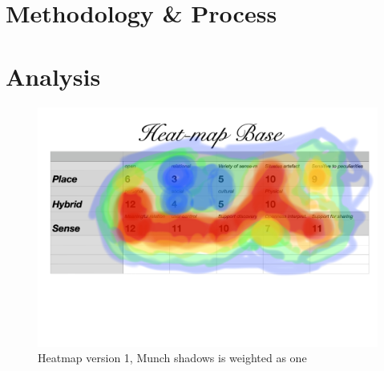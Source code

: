 \section{Methodology & Process}

\section{Analysis}

\begin{figure}[H]
\includegraphics[width=12.5cm]{pictures/dataset/heatmap.jpg}
\caption{Heatmap version 1, Munch shadows is weighted as one}
\end{figure}

